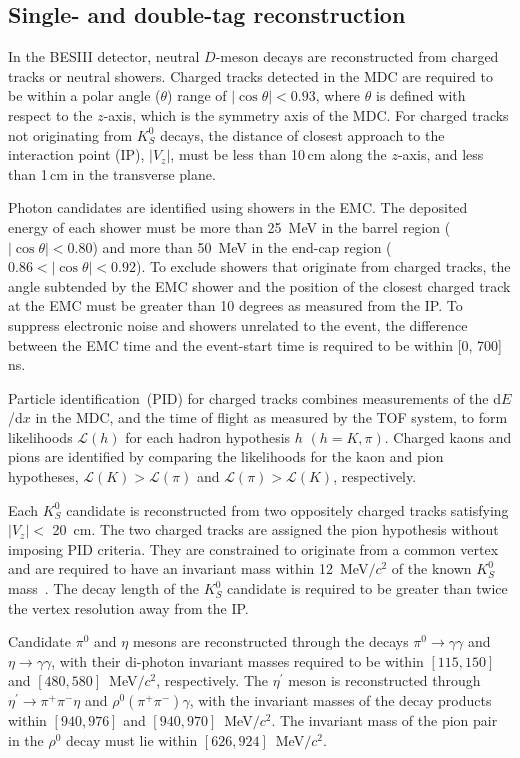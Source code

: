 \documentclass[12pt, a4paper, notitlepage, onecolumn]{article}
\begin{document}
\subsection{Single- and double-tag reconstruction}
\noindent In the BESIII detector, neutral $D$-meson decays are reconstructed from charged tracks or neutral showers. Charged tracks detected in the MDC are required to be within a polar angle ($\theta$) range of $|\!\cos\theta|<0.93$, where $\theta$ is defined with respect to the $z$-axis, which is the symmetry axis of the MDC. For charged tracks not originating from $K_S^0$ decays, the distance of closest approach to the interaction point (IP), $|V_{z}|$, must be less than 10\,cm along the $z$-axis, and less than 1\,cm in the transverse plane.

Photon candidates are identified using showers in the EMC. The deposited energy of each shower must be more than 25~MeV in the barrel region ($|\cos \theta|< 0.80$) and more than 50~MeV in the end-cap region ($0.86 <|\!\cos \theta|< 0.92$). To exclude showers that originate from charged tracks, the angle subtended by the EMC shower and the position of the closest charged track at the EMC must be greater than 10 degrees as measured from the IP. To suppress electronic noise and showers unrelated to the event, the difference between the EMC time and the event-start time is required to be within [0, 700]\,ns.

Particle identification~(PID) for charged tracks combines measurements of the d$E$/d$x$ in the MDC, and the time of flight as measured by the TOF system, to form likelihoods $\mathcal{L}(h)$ for each hadron hypothesis $h$ $(h=K,\pi)$. Charged kaons and pions are identified by comparing the likelihoods for the kaon and pion hypotheses, $\mathcal{L}(K)>\mathcal{L}(\pi)$ and $\mathcal{L}(\pi)>\mathcal{L}(K)$, respectively.

Each $K_{S}^0$ candidate is reconstructed from two oppositely charged tracks satisfying $|V_{z}|<$ 20~cm. The two charged tracks are assigned the pion hypothesis without imposing PID criteria. They are constrained to originate from a common vertex and are required to have an invariant mass within 12~MeV$/c^{2}$ of the known $K^0_{S}$ mass~\cite{pdg}. The decay length of the $K^0_S$ candidate is required to be greater than twice the vertex resolution away from the IP.

Candidate $\pi^0$ and $\eta$ mesons are reconstructed through the decays $\pi^0\to\gamma\gamma$ and $\eta\to\gamma\gamma$, with their di-photon invariant masses required to be within $[115, 150]$ and $[480, 580]$~MeV$/c^2$, respectively. The $\eta^\prime$ meson is reconstructed through  $\eta^\prime\to\pi^+\pi^-\eta$ and $\rho^0(\pi^+\pi^-)\gamma$, with the invariant masses of the decay products within $[940, 976]$ and $[940, 970]$~MeV$/c^2$. The invariant mass of the pion pair in the $\rho^0$ decay must lie within $[626, 924]$~MeV$/c^2$.
\end{document}
